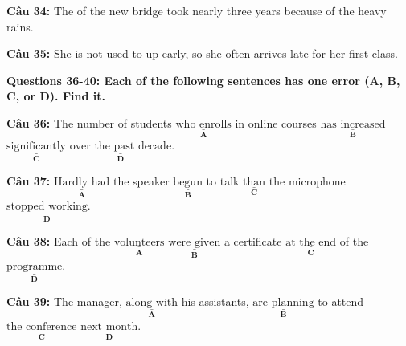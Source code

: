 \documentclass[12pt,a4paper]{article}
\providecommand{\errorpart}[2]{$\underset{\textbf{#1}}{\underline{\text{#2}}}$}
\begin{document}



\noindent \textbf{Câu 34:} The \underline{\hspace{1.5cm}} of the new bridge took nearly three years because of the heavy rains.\\
\noindent{}




\noindent \textbf{Câu 35:} She is not used to \underline{\hspace{1.5cm}} up early, so she often arrives late for her first class.\\
\noindent{}




\noindent\textbf{Questions 36-40: Each of the following sentences has one error (A, B, C, or D). Find it.}%


\par\nobreak


\noindent \textbf{Câu 36:} The number of students \errorpart{A}{who enrolls} in online courses \errorpart{B}{has increased} \errorpart{C}{significantly} \errorpart{D}{over the past decade}.




\noindent \textbf{Câu 37:} \errorpart{A}{Hardly had} the speaker \errorpart{B}{begun} to talk \errorpart{C}{than} the microphone \errorpart{D}{stopped working}.




\noindent \textbf{Câu 38:} Each of the \errorpart{A}{volunteers} \errorpart{B}{were given} a certificate \errorpart{C}{at the end} of the \errorpart{D}{programme}.




\noindent \textbf{Câu 39:} The manager, \errorpart{A}{along with} his assistants, \errorpart{B}{are planning} to attend \errorpart{C}{the conference} \errorpart{D}{next month}.
\end{document}
